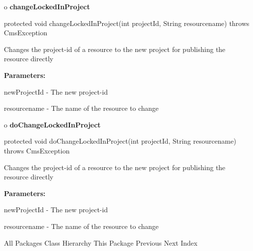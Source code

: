 o {\bf changeLockedInProject}

\begin{PRE}
 protected void changeLockedInProject(int projectId,
                                      String resourcename) throws CmsException
\end{PRE}

\begin{description}
\htmlDD Changes the project-id of a resource to the new project for publishing
the resource directly

\begin{description}
\item {\bf Parameters:}

newProjectId - The new project-id

resourcename - The name of the resource to change
\end{description}

\end{description}

o {\bf doChangeLockedInProject}

\begin{PRE}
 protected void doChangeLockedInProject(int projectId,
                                        String resourcename) throws CmsException
\end{PRE}

\begin{description}
\htmlDD Changes the project-id of a resource to the new project for publishing
the resource directly

\begin{description}
\item {\bf Parameters:}

newProjectId - The new project-id

resourcename - The name of the resource to change
\end{description}

\end{description}

\htmlHR

\begin{PRE}
All Packages  Class Hierarchy  This Package  Previous  Next  Index
\end{PRE}
